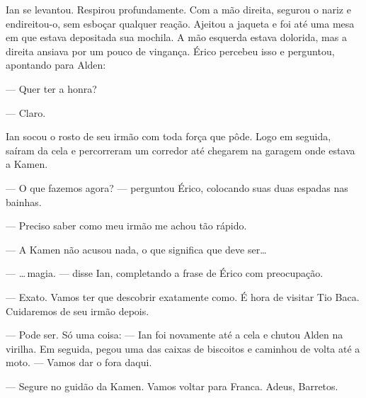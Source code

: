 Ian se levantou. Respirou profundamente. Com a mão direita, segurou o nariz e
endireitou-o, sem esboçar qualquer reação. Ajeitou a jaqueta e foi até uma mesa
em que estava depositada sua mochila. A mão esquerda estava dolorida, mas a
direita ansiava por um pouco de vingança. Érico percebeu isso e perguntou,
apontando para Alden:

--- Quer ter a honra?

--- Claro.

Ian socou o rosto de seu irmão com toda força que pôde. Logo em seguida, saíram
da cela e percorreram um corredor até chegarem na garagem onde estava a Kamen.

--- O que fazemos agora? --- perguntou Érico, colocando suas duas espadas nas
bainhas.

--- Preciso saber como meu irmão me achou tão rápido.

--- A Kamen não acusou nada, o que significa que deve ser\ldots

--- \ldots\,magia. --- disse Ian, completando a frase de Érico com preocupação.

--- Exato. Vamos ter que descobrir exatamente como. É hora de visitar Tio Baca.
Cuidaremos de seu irmão depois.

--- Pode ser. Só uma coisa: --- Ian foi novamente até a cela e chutou Alden na
virilha. Em seguida, pegou uma das caixas de biscoitos e caminhou de volta até
a moto. --- Vamos dar o fora daqui.

--- Segure no guidão da Kamen. Vamos voltar para Franca. Adeus, Barretos.
